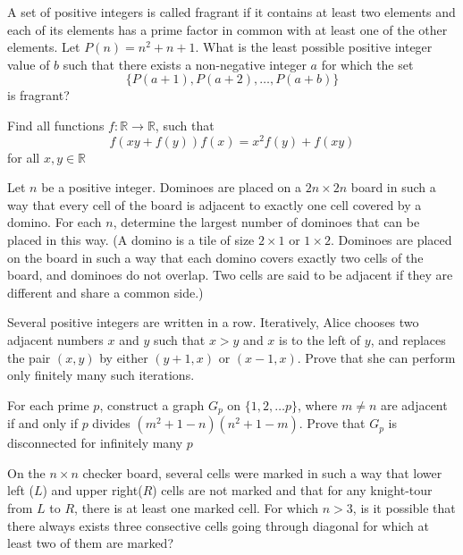 \documentclass[11pt]{scrartcl}
\begin{document}
\begin{problem}[403529216204023]
A set of positive integers is called fragrant if it contains at least two elements and each of its elements has a prime factor in common with at least one of the other elements. Let $P(n)=n^2+n+1$. What is the least possible positive integer value of $b$ such that there exists a non-negative integer $a$ for which the set$$\{P(a+1),P(a+2),\ldots,P(a+b)\}$$is fragrant?
\end{problem}
\begin{problem}[405752965370350]
Find all functions $f : \mathbb{R} \to \mathbb{R}$, such that
$$f\left(xy+f(y)\right)f(x)=x^2f(y)+f(xy)$$for all $x,y \in \mathbb{R}$
\end{problem}
\begin{problem}[406431313842688]
Let $n$ be a positive integer. Dominoes are placed on a $2n \times 2n$ board in such a way that every cell of the board is adjacent to exactly one cell covered by a domino. For each $n$, determine the largest number of dominoes that can be placed in this way.
(A domino is a tile of size $2 \times 1$ or $1 \times 2$. Dominoes are placed on the board in such a way that each domino covers exactly two cells of the board, and dominoes do not overlap. Two cells are said to be adjacent if they are different and share a common side.)
\end{problem}
\begin{problem}[406898817113614]
	Several positive integers are written in a row. Iteratively, Alice chooses two adjacent numbers $x$ and $y$ such that $x>y$ and $x$ is to the left of $y$, and replaces the pair $(x,y)$ by either $(y+1,x)$ or $(x-1,x)$. Prove that she can perform only finitely many such iterations.
\end{problem}
\begin{problem}[409146991986056]
For each prime $p$, construct a graph $G_p$ on $\{1,2,\ldots p\}$, where $m\neq n$ are adjacent if and only if $p$ divides $(m^{2} + 1-n)(n^{2} + 1-m)$. Prove that $G_p$ is disconnected for infinitely many $p$
\end{problem}
\begin{problem}[409149115429190]
	On the $n\times n$ checker board, several cells were marked in such a way that lower left ($L$) and upper right($R$) cells are not marked and that for any knight-tour from $L$ to $R$, there is at least one marked cell. For which $n>3$, is it possible that there always exists three consective cells going through diagonal for which at least two of them are marked?
\end{problem}
\end{document}
